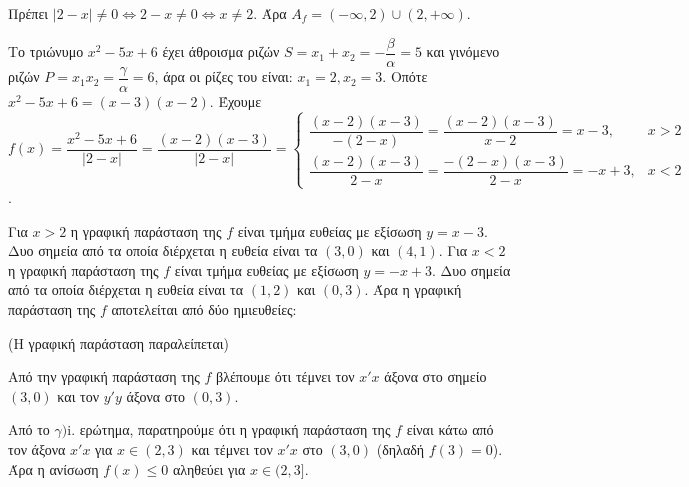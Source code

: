 
\begin{alist}
\item Πρέπει $|2 - x| \ne 0 \Leftrightarrow 2 - x \ne 0 \Leftrightarrow x \ne 2$. Άρα $A_f = (-\infty, 2) \cup (2, +\infty)$.

\item Το τριώνυμο $x^2 - 5x + 6$ έχει άθροισμα ριζών $S = x_1 + x_2 = -\dfrac{\beta}{\alpha} = 5$ και γινόμενο ριζών
$P = x_1 x_2 = \dfrac{\gamma}{\alpha} = 6$, άρα οι ρίζες του είναι: $x_1 = 2, x_2 = 3$. Οπότε $x^2 - 5x + 6 = (x - 3)(x - 2)$.
Έχουμε $f(x) = \dfrac{x^2 - 5x + 6}{|2 - x|} = \dfrac{(x - 2)(x - 3)}{|2 - x|} = \begin{cases} \dfrac{(x - 2)(x - 3)}{-(2 - x)} = \dfrac{(x - 2)(x - 3)}{x - 2} = x - 3, & x > 2 \\ \dfrac{(x - 2)(x - 3)}{2 - x} = \dfrac{-(2 - x)(x - 3)}{2 - x} = -x + 3, & x < 2 \end{cases}$.

\item 
\begin{rlist}
\item Για $x > 2$ η γραφική παράσταση της $f$ είναι τμήμα ευθείας με εξίσωση $y = x - 3$. Δυο σημεία
από τα οποία διέρχεται η ευθεία είναι τα $(3, 0)$ και $(4, 1)$. Για $x < 2$ η γραφική παράσταση
της $f$ είναι τμήμα ευθείας με εξίσωση $y = -x + 3$. Δυο σημεία από τα οποία διέρχεται η ευθεία
είναι τα $(1, 2)$ και $(0, 3)$. Άρα η γραφική παράσταση της $f$ αποτελείται από δύο ημιευθείες:

(Η γραφική παράσταση παραλείπεται)

\item Από την γραφική παράσταση της $f$ βλέπουμε ότι τέμνει τον $x'x$
άξονα στο σημείο $(3, 0)$ και τον $y'y$ άξονα στο $(0, 3)$.
\end{rlist}

\item Από το $\gamma\text{)i.}$ ερώτημα, παρατηρούμε ότι η γραφική παράσταση της $f$ είναι κάτω από τον
άξονα $x'x$ για $x \in (2, 3)$ και τέμνει τον $x'x$ στο $(3, 0)$ (δηλαδή $f(3) = 0$). Άρα η ανίσωση
$f(x) \le 0$ αληθεύει για $x \in (2, 3]$.
\end{alist}

